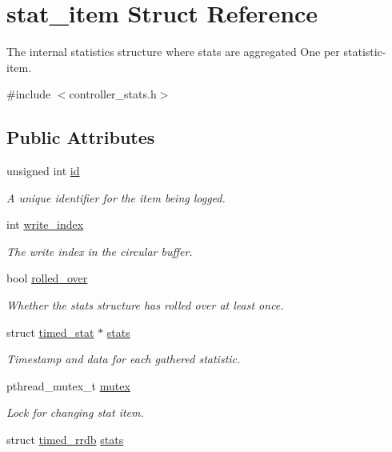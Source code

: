 \hypertarget{structstat__item}{\section{stat\-\_\-item Struct Reference}
\label{structstat__item}
}


The internal statistics structure where stats are aggregated One per statistic-\/item.  




{\ttfamily \#include $<$controller\-\_\-stats.\-h$>$}

\subsection*{Public Attributes}
\begin{DoxyCompactItemize}
\item 
unsigned int \hyperlink{structstat__item_a8f48ef423c6bb652d59e567f3585f6bd}{id}
\begin{DoxyCompactList}\small\item\em A unique identifier for the item being logged. \end{DoxyCompactList}\item 
int \hyperlink{structstat__item_ab965c534375a75af564610e9afe766f4}{write\-\_\-index}
\begin{DoxyCompactList}\small\item\em The write index in the circular buffer. \end{DoxyCompactList}\item 
bool \hyperlink{structstat__item_ac8339e9dc15d83bd0e8a4de598427b56}{rolled\-\_\-over}
\begin{DoxyCompactList}\small\item\em Whether the stats structure has rolled over at least once. \end{DoxyCompactList}\item 
struct \hyperlink{structtimed__stat}{timed\-\_\-stat} $\ast$ \hyperlink{structstat__item_ad9e139d7db4acd1f95968520023895f5}{stats}
\begin{DoxyCompactList}\small\item\em Timestamp and data for each gathered statistic. \end{DoxyCompactList}\item 
pthread\-\_\-mutex\-\_\-t \hyperlink{structstat__item_a5dc6d221657bec60e0613ef64ea6ee28}{mutex}
\begin{DoxyCompactList}\small\item\em Lock for changing stat item. \end{DoxyCompactList}\item 
struct \hyperlink{structtimed__rrdb}{timed\-\_\-rrdb} \hyperlink{structstat__item_ac4feb1e4a0ac9c58669b532bd0c29c45}{stats}
\end{DoxyCompactItemize}


